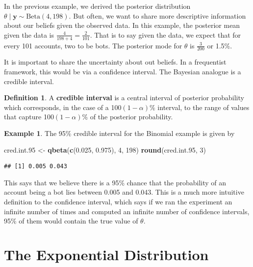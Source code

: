 \documentclass[
]{book}
\newenvironment{Shaded}{\begin{snugshade}}{\end{snugshade}}
\newcommand{\DecValTok}[1]{\textcolor[rgb]{0.00,0.00,0.81}{#1}}
\newcommand{\FloatTok}[1]{\textcolor[rgb]{0.00,0.00,0.81}{#1}}
\newcommand{\FunctionTok}[1]{\textcolor[rgb]{0.13,0.29,0.53}{\textbf{#1}}}
\newcommand{\NormalTok}[1]{#1}
\newcommand{\OtherTok}[1]{\textcolor[rgb]{0.56,0.35,0.01}{#1}}
\theoremstyle{definition}
\newtheorem{definition}{Definition}[chapter]
\theoremstyle{definition}
\newtheorem{example}{Example}[chapter]
\theoremstyle{definition}
\theoremstyle{definition}
\theoremstyle{remark}
\begin{document}
In the previous example, we derived the posterior distribution \(\theta \mid \boldsymbol{y} \sim \textrm{Beta}(4, 198)\). But often, we want to share more descriptive information about our beliefs given the observed data. In this example, the posterior mean given the data is \(\frac{4}{198+4} = \frac{2}{101}\). That is to say given the data, we expect that for every 101 accounts, two to be bots. The posterior mode for \(\theta\) is \(\frac{3}{200}\) or 1.5\%.

It is important to share the uncertainty about out beliefs. In a frequentist framework, this would be via a confidence interval. The Bayesian analogue is a credible interval.

\begin{definition}
A \textbf{credible interval} is a central interval of posterior probability which corresponds, in the case of a 100\((1-\alpha)\)\% interval, to the range of values that capture 100\((1-\alpha)\)\% of the posterior probability.
\end{definition}

\begin{example}
The 95\% credible interval for the Binomial example is given by

\begin{Shaded}
\begin{Highlighting}[]
\NormalTok{cred.int}\FloatTok{.95} \OtherTok{\textless{}{-}} \FunctionTok{qbeta}\NormalTok{(}\FunctionTok{c}\NormalTok{(}\FloatTok{0.025}\NormalTok{, }\FloatTok{0.975}\NormalTok{), }\DecValTok{4}\NormalTok{, }\DecValTok{198}\NormalTok{)}
\FunctionTok{round}\NormalTok{(cred.int}\FloatTok{.95}\NormalTok{, }\DecValTok{3}\NormalTok{)}
\end{Highlighting}
\end{Shaded}

\begin{verbatim}
## [1] 0.005 0.043
\end{verbatim}

This says that we believe there is a 95\% chance that the probability of an account being a bot lies between 0.005 and 0.043. This is a much more intuitive definition to the confidence interval, which says if we ran the experiment an infinite number of times and computed an infinite number of confidence intervals, 95\% of them would contain the true value of \(\theta\).
\end{example}

\section{The Exponential Distribution}\label{the-exponential-distribution}
\end{document}
